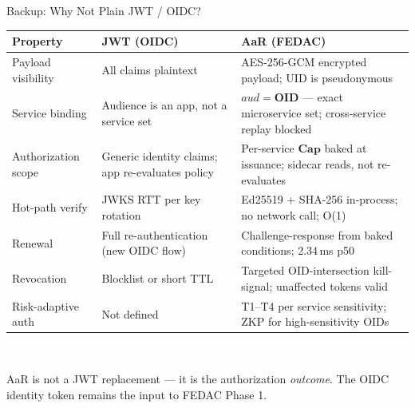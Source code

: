 \documentclass[aspectratio=169,11pt]{beamer}
\newcommand{\pinkbanner}[1]{%
  \begin{center}
  \begin{tcolorbox}[colback=fedacGray,colframe=fedacGray,
                    boxrule=0pt,arc=1mm,left=10pt,right=10pt,top=3pt,bottom=3pt,
                    width=0.96\linewidth,
                    borderline west={2pt}{0pt}{fedacTeal}]
  \footnotesize\color{fedacNavyD}#1
  \end{tcolorbox}
  \end{center}}
\begin{document}
{%
\begin{frame}[noframenumbering]{Backup: Why Not Plain JWT / OIDC?}
\vspace{2pt}
\centering
\scriptsize
\setlength{\tabcolsep}{4pt}
\renewcommand{\arraystretch}{1.0}
\begin{tabular}{p{2.8cm} p{3.2cm} p{4.8cm}}
\toprule
\rowcolor{fedacGray}\textbf{Property} & \textbf{JWT (OIDC)} & \textbf{AaR (FEDAC)}\\
\midrule
Payload visibility    & All claims plaintext & AES-256-GCM encrypted payload; UID is pseudonymous \\
Service binding       & Audience is an app, not a service set & $aud = \mathbf{OID}$ — exact microservice set; cross-service replay blocked \\
Authorization scope   & Generic identity claims; app re-evaluates policy & Per-service $\mathbf{Cap}$ baked at issuance; sidecar reads, not re-evaluates \\
Hot-path verify       & JWKS RTT per key rotation & Ed25519 + SHA-256 in-process; no network call; O(1) \\
Renewal               & Full re-authentication (new OIDC flow) & Challenge-response from baked conditions; 2.34\,ms p50 \\
Revocation            & Blocklist or short TTL & Targeted OID-intersection kill-signal; unaffected tokens valid \\
Risk-adaptive auth    & Not defined & T1--T4 per service sensitivity; ZKP for high-sensitivity OIDs \\
\bottomrule
\end{tabular}\\[4pt]
\pinkbanner{AaR is not a JWT replacement — it is the authorization \emph{outcome}. The OIDC identity token remains the input to FEDAC Phase 1.}
\end{frame}

}
\end{document}
